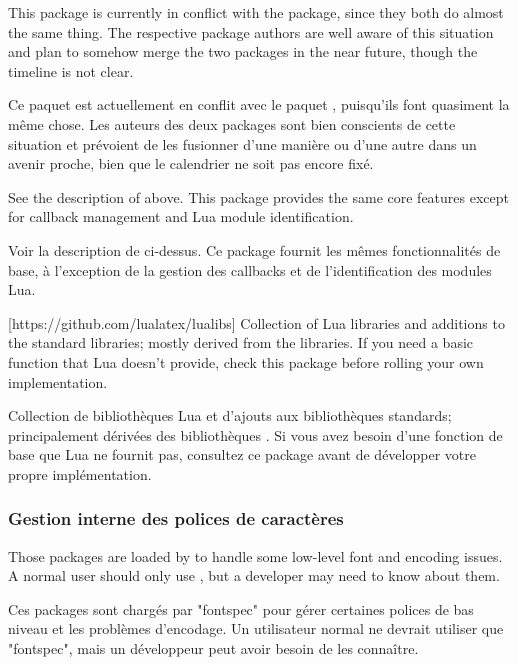\documentclass{lltxdoc}
\begin{document}
 This package is currently in conflict with the 
package, since they both do almost the same thing. The respective package
authors are well aware of this situation and plan to somehow merge the two
packages in the near future, though the timeline is not clear.

 Ce paquet est actuellement en conflit avec le paquet , puisqu'ils font quasiment la même chose. Les auteurs des deux packages sont bien conscients de cette situation et prévoient de les fusionner d'une manière ou d'une autre dans un avenir proche, bien que le calendrier ne soit pas encore fixé.

See the description of  above. This package provides the same
core features except for callback management and Lua module identification.

Voir la description de  ci-dessus. Ce package fournit les mêmes fonctionnalités de base, à l'exception de la gestion des callbacks et de l'identification des modules Lua.

[https://github.com/lualatex/lualibs]
Collection of Lua libraries and additions to the standard libraries; mostly
derived from the \context libraries. If you need a basic function that Lua
doesn't provide, check this package before rolling your own implementation.

Collection de bibliothèques Lua et d'ajouts aux bibliothèques standards; principalement dérivées des bibliothèques \context. Si vous avez besoin d'une fonction de base que Lua ne fournit pas, consultez ce package avant de développer votre propre implémentation.

\subsubsection{Gestion interne des polices de caractères}\label{fontint}

Those packages are loaded by  to handle some low-level font and
encoding issues. A normal user should only use , but a developer
may need to know about them.


Ces packages sont chargés par "fontspec" pour gérer certaines polices de bas niveau et les problèmes d'encodage. Un utilisateur normal ne devrait utiliser que "fontspec", mais un développeur peut avoir besoin de les connaître.
\end{document}

